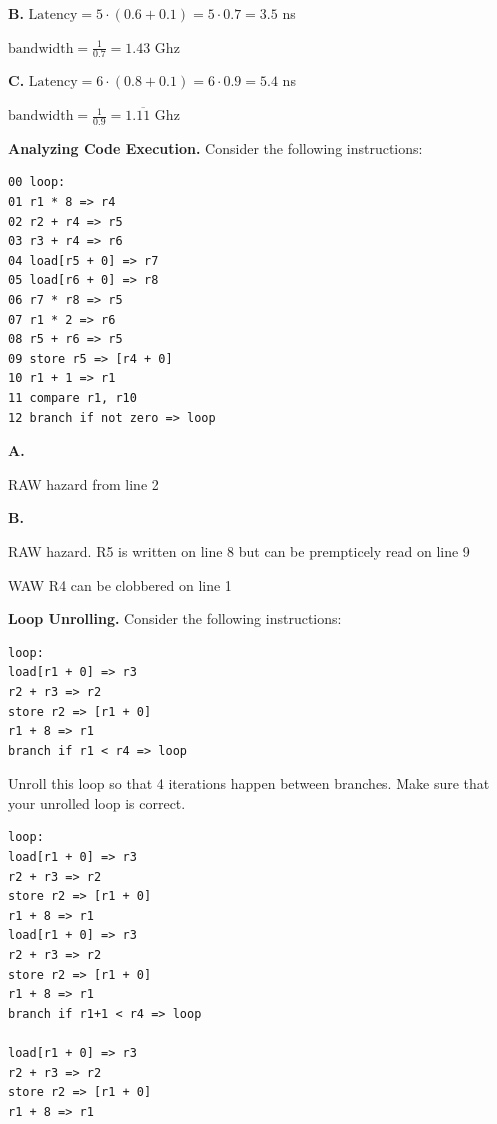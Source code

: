 \documentclass{exam}
\begin{document}
\begin{questions}
\textbf{B.} $\mathrm{Latency}= 5\cdot (0.6+0.1)=5 \cdot 0.7 = 3.5$ ns

$\mathrm{bandwidth} = \frac{1}{\mathrm{0.7}}= 1.43$ Ghz


\textbf{C.} $\mathrm{Latency}= 6\cdot (0.8+0.1)=6 \cdot 0.9 = 5.4$ ns

$\mathrm{bandwidth} = \frac{1}{\mathrm{0.9}}=1.\overline{11}$ Ghz


\question[20]
\textbf{Analyzing Code Execution.}
Consider the following instructions:
\begin{lstlisting}
00 loop:
01 r1 * 8 => r4
02 r2 + r4 => r5
03 r3 + r4 => r6
04 load[r5 + 0] => r7
05 load[r6 + 0] => r8
06 r7 * r8 => r5
07 r1 * 2 => r6
08 r5 + r6 => r5
09 store r5 => [r4 + 0]
10 r1 + 1 => r1
11 compare r1, r10
12 branch if not zero => loop
\end{lstlisting}


\textbf{A.}

RAW hazard from line 2

\textbf{B.}

RAW hazard. R5 is written on line 8 but can be prempticely read on line 9


WAW R4 can be clobbered on line 1



\question[5]
\textbf{Loop Unrolling.}
Consider the following instructions:
\begin{lstlisting}
loop:
load[r1 + 0] => r3
r2 + r3 => r2
store r2 => [r1 + 0]
r1 + 8 => r1
branch if r1 < r4 => loop
\end{lstlisting}
Unroll this loop so that 4 iterations happen between branches. 
Make sure that your unrolled loop is correct. 

\begin{lstlisting}
loop:
load[r1 + 0] => r3
r2 + r3 => r2
store r2 => [r1 + 0]
r1 + 8 => r1
load[r1 + 0] => r3
r2 + r3 => r2
store r2 => [r1 + 0]
r1 + 8 => r1
branch if r1+1 < r4 => loop

load[r1 + 0] => r3
r2 + r3 => r2
store r2 => [r1 + 0]
r1 + 8 => r1
\end{lstlisting}

\end{questions}
\end{document}
